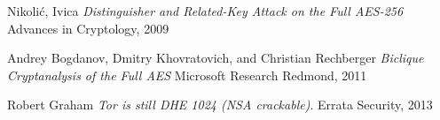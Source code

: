 \documentclass[journal]{IEEEtran}
\begin{document}
\begin{thebibliography}{9}
  Nikolić, Ivica
  \emph{Distinguisher and Related-Key Attack on the Full AES-256}
  Advances in Cryptology, 2009

  Andrey Bogdanov, Dmitry Khovratovich, and Christian Rechberger
  \emph{Biclique Cryptanalysis of the Full AES}
   Microsoft Research Redmond, 2011

  Robert Graham
  \emph{Tor is still DHE 1024 (NSA crackable)}.
  Errata Security, 2013

\end{thebibliography}
\end{document}
